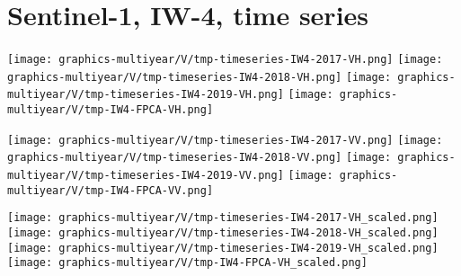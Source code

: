 
\section{Sentinel-1, IW-4, time series}
\setcounter{theorem}{0}

\renewcommand{\theenumi}{\roman{enumi}}
\renewcommand{\labelenumi}{\textnormal{(\theenumi)}$\;\;$}


\begin{center}
\begin{minipage}{7.0in}
\texttt{[image: graphics-multiyear/V/tmp-timeseries-IW4-2017-VH.png]}
\quad\quad
\texttt{[image: graphics-multiyear/V/tmp-timeseries-IW4-2018-VH.png]}
\vskip 1.0cm
\texttt{[image: graphics-multiyear/V/tmp-timeseries-IW4-2019-VH.png]}
\quad
\texttt{[image: graphics-multiyear/V/tmp-IW4-FPCA-VH.png]}
\end{minipage}
\end{center}


\begin{center}
\begin{minipage}{7.0in}
\texttt{[image: graphics-multiyear/V/tmp-timeseries-IW4-2017-VV.png]}
\quad\quad
\texttt{[image: graphics-multiyear/V/tmp-timeseries-IW4-2018-VV.png]}
\vskip 1.0cm
\texttt{[image: graphics-multiyear/V/tmp-timeseries-IW4-2019-VV.png]}
\quad
\texttt{[image: graphics-multiyear/V/tmp-IW4-FPCA-VV.png]}
\end{minipage}
\end{center}


\begin{center}
\begin{minipage}{7.0in}
\texttt{[image: graphics-multiyear/V/tmp-timeseries-IW4-2017-VH\_scaled.png]}
\quad\quad
\texttt{[image: graphics-multiyear/V/tmp-timeseries-IW4-2018-VH\_scaled.png]}
\vskip 1.0cm
\texttt{[image: graphics-multiyear/V/tmp-timeseries-IW4-2019-VH\_scaled.png]}
\quad
\texttt{[image: graphics-multiyear/V/tmp-IW4-FPCA-VH\_scaled.png]}
\end{minipage}
\end{center}

